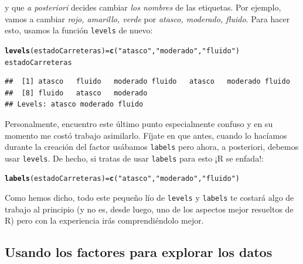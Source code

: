 \documentclass[10pt,a4paper]{article}\usepackage[]{graphicx}\usepackage[]{color}
\makeatletter
\newcommand{\hlstr}[1]{\textcolor[rgb]{0.192,0.494,0.8}{#1}}%
\newcommand{\hlstd}[1]{\textcolor[rgb]{0.345,0.345,0.345}{#1}}%
\newcommand{\hlkwb}[1]{\textcolor[rgb]{0.69,0.353,0.396}{#1}}%
\newcommand{\hlkwd}[1]{\textcolor[rgb]{0.737,0.353,0.396}{\textbf{#1}}}%
\newenvironment{kframe}{%
 \def\at@end@of@kframe{}%
 \ifinner\ifhmode%
  \def\at@end@of@kframe{\end{minipage}}%
  \begin{minipage}{\columnwidth}%
 \fi\fi%
 \def\FrameCommand##1{\hskip\@totalleftmargin \hskip-\fboxsep
 \colorbox{shadecolor}{##1}\hskip-\fboxsep
     \hskip-\linewidth \hskip-\@totalleftmargin \hskip\columnwidth}%
 \MakeFramed {\advance\hsize-\width
   \@totalleftmargin\z@ \linewidth\hsize
   \@setminipage}}%
 {\par\unskip\endMakeFramed%
 \at@end@of@kframe}
\newenvironment{knitrout}{}{} %
\makeatother
\begin{document}
y que {\em a posteriori} decides cambiar {\em los nombres} de las etiquetas. Por ejemplo, vamos a cambiar
{\em rojo, amarillo, verde} por {\em atasco, moderado, fluido}. Para hacer esto, usamos la función {\tt levels} de nuevo:
\begin{knitrout}
\color{fgcolor}\begin{kframe}
\begin{alltt}
\hlkwd{levels}\hlstd{(estadoCarreteras)} \hlkwb{=} \hlkwd{c}\hlstd{(}\hlstr{"atasco"}\hlstd{,} \hlstr{"moderado"}\hlstd{,} \hlstr{"fluido"}\hlstd{)}
\hlstd{estadoCarreteras}
\end{alltt}
\begin{verbatim}
##  [1] atasco   fluido   moderado fluido   atasco   moderado fluido  
##  [8] fluido   atasco   moderado
## Levels: atasco moderado fluido
\end{verbatim}
\end{kframe}
\end{knitrout}
Personalmente, encuentro este último punto especialmente confuso y en su momento me costó trabajo asimilarlo. Fíjate en que antes, cuando lo hacíamos durante la creación del factor usábamos {\tt labels} pero ahora, a posteriori, debemos usar {\tt levels}. De hecho, si tratas de usar {\tt labels} para esto ¡R se enfada!:
\begin{knitrout}
\color{fgcolor}\begin{kframe}
\begin{alltt}
\hlkwd{labels}\hlstd{(estadoCarreteras)} \hlkwb{=} \hlkwd{c}\hlstd{(}\hlstr{"atasco"}\hlstd{,} \hlstr{"moderado"}\hlstd{,} \hlstr{"fluido"}\hlstd{)}
\end{alltt}


{\ttfamily\noindent\bfseries{}}\end{kframe}
\end{knitrout}
Como hemos dicho, todo este pequeño lío de {\tt levels} y {\tt labels} te costará algo de trabajo al principio (y no es, desde luego, uno de los aspectos mejor resueltos de R) pero con la experiencia irás comprendiéndolo mejor.


\subsection{Usando los factores para explorar los datos}
\label{tut08:sec:UsandoFactoresExplorarDatos}
\end{document}
